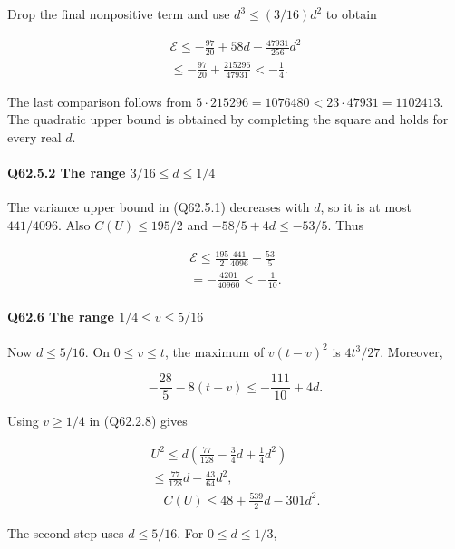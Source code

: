 Drop the final nonpositive term and use $d^3\le\allowbreak (3/16)d^2$ to obtain

\[
\begin{gathered}
\mathcal E\le-\frac{97}{20}+58d-\frac{47931}{256}d^2\\
\le-\frac{97}{20}+\frac{215296}{47931}<-\frac14.
\end{gathered}\tag{Q62.5.2}\label{eq:Q62:Q62:5:2}
\]

The last comparison follows from $5\cdot215296=\allowbreak 1076480<\allowbreak 23\cdot47931=\allowbreak 1102413$.
The quadratic upper bound is obtained by completing the square and holds for every real $d$.

\paragraph{Q62.5.2 The range $3/16\le\allowbreak  d\le\allowbreak 1/4$}

The variance upper bound in (Q62.5.1) decreases with $d$, so it is at most $441/4096$.
Also $C(U)\le\allowbreak 195/2$ and $-58/5+4d\le\allowbreak -53/5$. Thus

\[
\begin{gathered}
\mathcal E\le\frac{195}{2}\frac{441}{4096}-\frac{53}{5}\\
=-\frac{4201}{40960}<-\frac1{10}.
\end{gathered}\tag{Q62.5.3}\label{eq:Q62:Q62:5:3}
\]



\paragraph{Q62.6 The range $1/4\le\allowbreak  v\le\allowbreak 5/16$}

Now $d\le\allowbreak 5/16$. On $0\le\allowbreak  v\le\allowbreak  t$, the maximum of $v(t-v)^2$ is $4t^3/27$.
Moreover,

\[
-\frac{28}{5}-8(t-v)\le-\frac{111}{10}+4d.
\]

Using $v\ge\allowbreak 1/4$ in (Q62.2.8) gives

\[
\begin{gathered}
U^2\le d\left(\frac{77}{128}-\frac34d+\frac14d^2\right)\\
\le\frac{77}{128}d-\frac{43}{64}d^2,\\
\quad C(U)\le48+\frac{539}{2}d-301d^2.
\end{gathered}\tag{Q62.6.1}\label{eq:Q62:Q62:6:1}
\]

The second step uses $d\le\allowbreak 5/16$. For $0\le\allowbreak  d\le\allowbreak 1/3$,

